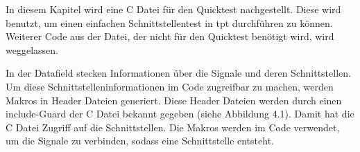 In diesem Kapitel wird eine C Datei für den Quicktest nachgestellt. Diese wird benutzt, um einen einfachen Schnittstellentest
in \ac{tpt} durchführen zu können. Weiterer Code aus der Datei, der nicht für den Quicktest benötigt wird, wird weggelassen.

In der Datafield stecken Informationen über die Signale und deren Schnittstellen. Um diese Schnittstelleninformationen
im Code zugreifbar zu machen, werden Makros in Header Dateien generiert. Diese Header Dateien werden durch einen include-Guard der C Datei bekannt gegeben (siehe Abbildung 4.1). Damit hat die C Datei Zugriff
auf die Schnittstellen. Die Makros werden im Code verwendet, um die Signale zu verbinden, sodass eine Schnittstelle entsteht.


